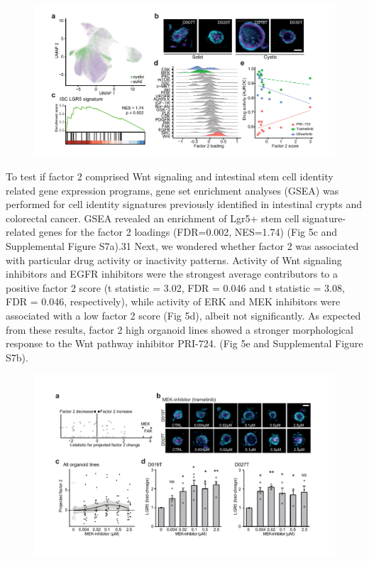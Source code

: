 \begin{flushleft}
\begin{figure}[h!]
\centering
\includegraphics[width=\textwidth,
                height=\textheight,
                keepaspectratio]{figures/promise/pdf/fig_5_1.pdf}
\caption{}
\label{fig_251}
\end{figure}
\bigbreak

To test if factor 2 comprised Wnt signaling and intestinal stem cell identity related gene expression programs, gene set enrichment analyses (GSEA) was performed for cell identity signatures previously identified in intestinal crypts and colorectal cancer. GSEA revealed an enrichment of Lgr5+ stem cell signature-related genes for the factor 2 loadings (FDR=0.002, NES=1.74) (Fig 5c and Supplemental Figure S7a).31 Next, we wondered whether factor 2 was associated with particular drug activity or inactivity patterns. Activity of Wnt signaling inhibitors and EGFR inhibitors were the strongest average contributors to a positive factor 2 score (t statistic = 3.02, FDR = 0.046 and t statistic = 3.08, FDR = 0.046, respectively), while activity of ERK and MEK inhibitors were associated with a low factor 2 score (Fig 5d), albeit not significantly. As expected from these results, factor 2 high organoid lines showed a stronger morphological response to the Wnt pathway inhibitor PRI-724. (Fig 5e and Supplemental Figure S7b).




\begin{figure}[h!]
\centering
\includegraphics[width=\textwidth,
                height=\textheight,
                keepaspectratio]{figures/promise/pdf/fig_5_3.pdf}
\caption{}
\label{fig_253}
\end{figure}
\bigbreak


\end{flushleft}
